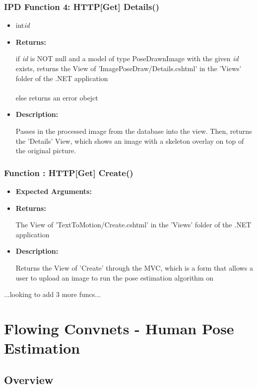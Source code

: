 \documentclass{scrreprt}
\begin{document}
\subsubsection{IPD Function 4: HTTP[Get] Details()}
\begin{itemize}
    \item int\quad\textit{id}

    \item \textbf{Returns:}

    if \textit{id} is NOT null and a model of type PoseDrawnImage with the given \textit{id} exists, returns the View of 'ImagePoseDraw/Details.cshtml' in the 'Views' folder of the .NET application
    \\\\
    else returns an error obejct

    \item \textbf{Description:}

    Passes in the processed image from the database into the view. Then, returns the 'Details' View, which shows an image with a skeleton overlay on top of the original picture.
\end{itemize}


\subsubsection{Function  : HTTP[Get] Create()}
\begin{itemize}
    \item \textbf{Expected Arguments:}
    \item \textbf{Returns:}

    The View of 'TextToMotion/Create.cshtml' in the 'Views' folder of the .NET application

    \item \textbf{Description:}

    Returns the View of 'Create' through the MVC, which is a form that allows a user to upload an image to run the pose estimation algorithm on
\end{itemize}



...looking to add 3 more funcs...


\break

\section{Flowing Convnets - Human Pose Estimation}

\subsection{Overview}
\end{document}
